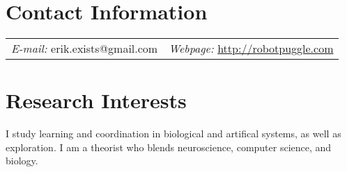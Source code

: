 \documentclass[margin,line]{res}
\begin{document}
\newcommand{\link}[1]{\texttt{#1}}
\providecommand{\tightlist}{%
      \setlength{\itemsep}{0pt}\setlength{\parskip}{0pt}}



\begin{resume}
\section{\sc Contact Information}
\vspace{.05in}
\begin{tabular}{@{}p{2in}p{4in}}
{\it E-mail:}  erik.exists@gmail.com   & {\it Webpage:} \href{http://robotpuggle.com}{http://robotpuggle.com} \\
\end{tabular}


\section{\sc Research Interests}

I study learning and coordination in biological and artifical systems, as well as exploration. I am a theorist who blends neuroscience, computer science, and biology.










\end{resume}
\end{document}
